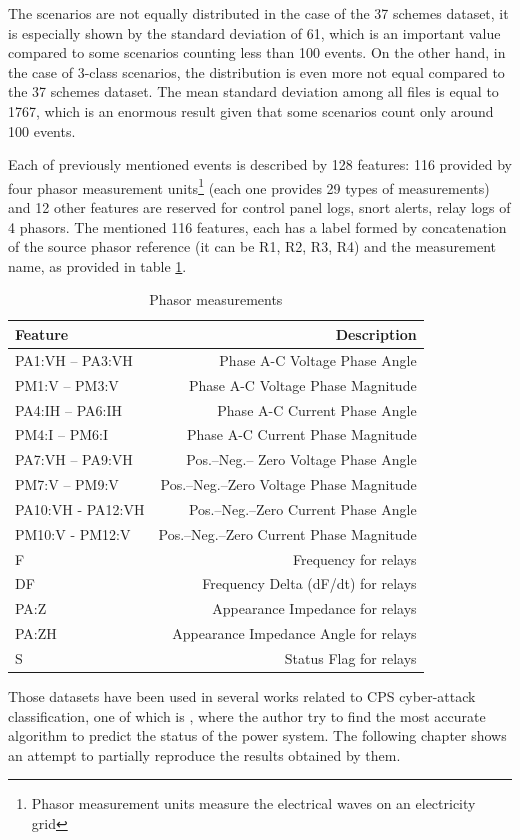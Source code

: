 The scenarios are not equally distributed in the case of the 37 schemes dataset, it is especially shown by the standard deviation of 61, which is an important value compared to some scenarios counting less than 100 events. On the other hand, in the case of 3-class scenarios, the distribution is even more not equal compared to the 37 schemes dataset. The mean standard deviation among all files is equal to 1767, which is an enormous result given that some scenarios count only around 100 events.

Each of previously mentioned events is described by 128 features: 116 provided by four phasor measurement units\footnote{Phasor measurement units measure the electrical waves on an electricity grid} (each one provides 29 types of measurements) and 12 other features are reserved for control panel logs, snort alerts, relay logs of 4 phasors. The mentioned 116 features, each has a label formed by concatenation of the source phasor reference (it can be R1, R2, R3, R4) and the measurement name, as provided in table \ref{tab:pmu_mes}.

\begin{table}[H]
    \centering
    \caption[Phasor measurements]{Phasor measurements \cite{adhikari_power_2014}} \label{tab:pmu_mes}
    \begin{tabular}{lr}
        \toprule
        Feature&Description \\
        \midrule
        PA1:VH – PA3:VH&Phase A-C Voltage Phase Angle \\
        PM1:V – PM3:V&Phase A-C Voltage Phase Magnitude \\
        PA4:IH – PA6:IH&Phase A-C Current Phase Angle \\
        PM4:I – PM6:I&Phase A-C Current Phase Magnitude \\
        PA7:VH – PA9:VH&Pos.–Neg.– Zero Voltage Phase Angle \\
        PM7:V – PM9:V&Pos.–Neg.–Zero Voltage Phase Magnitude \\
        PA10:VH - PA12:VH&Pos.–Neg.–Zero Current Phase Angle \\
        PM10:V - PM12:V&Pos.–Neg.–Zero Current Phase Magnitude \\
        F&Frequency for relays \\
        DF&Frequency Delta (dF/dt) for relays \\
        PA:Z&Appearance Impedance for relays \\
        PA:ZH&Appearance Impedance Angle for relays \\
        S&Status Flag for relays \\
        \bottomrule
    \end{tabular}
\end{table} 

Those datasets have been used in several works related to CPS cyber-attack classification, one of which is \cite{borges_hink_machine_2014-1}, where the author try to find the most accurate algorithm to predict the status of the power system. The following chapter shows an attempt to partially reproduce the results obtained by them.
